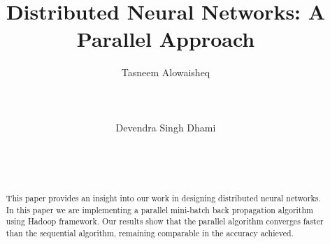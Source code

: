 \documentclass{sig-alternate-05-2015}
\begin{document}
\title{Distributed Neural Networks: A Parallel Approach}
%
\author{
%
%
\alignauthor
Tasneem Alowaisheq\\
       \\
       \\
       \\
\alignauthor
Devendra Singh Dhami\\
       \\
       \\
       \\
}

\maketitle
\begin{abstract}
This paper provides an insight into our work in designing distributed neural networks. In this paper we are implementing a parallel mini-batch back propagation algorithm using Hadoop framework. Our results show that the parallel algorithm converges faster than the sequential algorithm, remaining comparable in the accuracy achieved.
\end{abstract}


%
%

%
%

%
%
\printccsdesc
\end{document}
